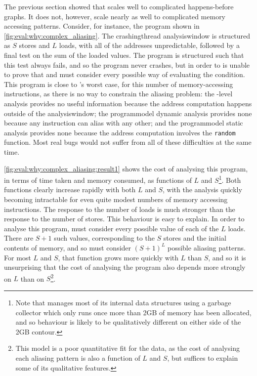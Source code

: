 \noindent
The previous section showed that {\technique} scales well to
complicated happens-before graphs.  It does not, however, scale nearly
as well to complicated memory accessing patterns.  Consider, for
instance, the program shown in
\autoref{fig:eval:why:complex_aliasing}.  The \gls{crashingthread}
\gls{analysiswindow} is structured as $S$ stores and $L$ loads, with
all of the addresses unpredictable, followed by a final test on the
sum of the loaded values.  The program is structured such that this
test always fails, and so the program never crashes, but in order to
{\technique} is unable to prove that and must consider every possible
way of evaluating the condition.  This program is close to
{\technique}'s worst case, for this number of memory-accessing
instructions, as there is no way to constrain the aliasing problem:
the {\StateMachine}-level analysis provides no useful information
because the address computation happens outside of the
\gls{analysiswindow}; the \gls{programmodel} dynamic analysis provides
none because any instruction can alias with any other; and the
\gls{programmodel} static analysis provides none because the address
computation involves the \texttt{random} function.  Most real bugs
would not suffer from all of these difficulties at the same time.

\autoref{fig:eval:why:complex_aliasing:result1} shows the cost of
analysing this program, in terms of time taken and memory consumed, as
functions of $L$ and $S$\footnote{Note that {\implementation} manages
  most of its internal data structures using a garbage collector which
  only runs once more than 2GB of memory has been allocated, and so
  behaviour is likely to be qualitatively different on either side of
  the 2GB contour.}.  Both functions clearly increase rapidly with
both $L$ and $S$, with the analysis quickly becoming intractable for
even quite modest numbers of memory accessing instructions.  The
response to the number of loads is much stronger than the response to
the number of stores.  This behaviour is easy to explain.  In order to
analyse this program, {\technique} must consider every possible value
of each of the $L$ loads.  There are $S+1$ such values, corresponding
to the $S$ stores and the initial contents of memory, and so
{\technique} must consider $(S+1)^L$ possible aliasing patterns.  For
most $L$ and $S$, that function grows more quickly with $L$ than $S$,
and so it is unsurprising that the cost of analysing the program also
depends more strongly on $L$ than on $S$\footnote{This model is a poor
  quantitative fit for the data, as the cost of analysing each
  aliasing pattern is also a function of $L$ and $S$, but suffices to
  explain some of its qualitative features.}.

